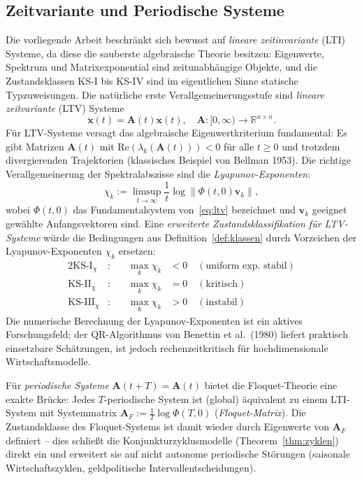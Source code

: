 \documentclass[a4paper, 12pt, twoside, openright]{report}
\theoremstyle{definition}
\theoremstyle{definition}
\newcommand{\R}{\mathbb{R}}
\newcommand{\vx}{\bm{x}}
\newcommand{\vA}{\bm{A}}
\newcommand{\re}{\mathrm{Re}}
\newcommand{\KS}{\mathrm{KS}}
\begin{document}
\subsection{Zeitvariante und Periodische Systeme}
\label{subsec:zeitvariant}

Die vorliegende Arbeit beschränkt sich bewusst auf \emph{lineare zeitinvariante} (LTI)
Systeme, da diese die sauberste algebraische Theorie besitzen: Eigenwerte, Spektrum und
Matrixexponential sind zeitunabhängige Objekte, und die Zustandsklassen KS-I bis KS-IV
sind im eigentlichen Sinne statische Typzuweisungen. Die natürliche erste
Verallgemeinerungsstufe sind \emph{lineare zeitvariante} (LTV) Systeme
\begin{equation}
  \dot{\vx}(t) = \vA(t)\vx(t), \quad \vA : [0,\infty) \to \R^{n \times n}.
  \label{eq:ltv}
\end{equation}
Für LTV-Systeme versagt das algebraische Eigenwertkriterium fundamental: Es gibt
Matrizen $\vA(t)$ mit $\re(\lambda_k(\vA(t))) < 0$ für alle $t \geq 0$ und trotzdem
divergierenden Trajektorien (klassisches Beispiel von Bellman 1953). Die richtige
Verallgemeinerung der Spektralabszisse sind die \emph{Lyapunov-Exponenten}:
\begin{equation}
  \chi_k := \limsup_{t \to \infty} \frac{1}{t} \log \| \Phi(t,0)\bm{v}_k \|,
  \label{eq:lyapunov_exp}
\end{equation}
wobei $\Phi(t,0)$ das Fundamentalsystem von~\eqref{eq:ltv} bezeichnet und $\bm{v}_k$
geeignet gewählte Anfangsvektoren sind. Eine \emph{erweiterte Zustandsklassifikation
für LTV-Systeme} würde die Bedingungen aus Definition~\ref{def:klassen} durch
Vorzeichen der Lyapunov-Exponenten $\chi_k$ ersetzen:
\begin{alignat}{2}
  \KS\text{-I}_\chi  &:\quad &\max_k \chi_k &< 0 \quad (\text{uniform exp. stabil})\\
  \KS\text{-II}_\chi &:\quad &\max_k \chi_k &= 0 \quad (\text{kritisch})\\
  \KS\text{-III}_\chi&:\quad &\max_k \chi_k &> 0 \quad (\text{instabil})
\end{alignat}
Die numerische Berechnung der Lyapunov-Exponenten ist ein aktives Forschungsfeld;
der QR-Algorithmus von Benettin et al.~(1980) liefert praktisch einsetzbare Schätzungen,
ist jedoch rechenzeitkritisch für hochdimensionale Wirtschaftsmodelle.

Für \emph{periodische Systeme} $\vA(t+T) = \vA(t)$ bietet die Floquet-Theorie
eine exakte Brücke: Jedes $T$-periodische System ist (global) äquivalent zu einem
LTI-System mit Systemmatrix $\vA_F := \frac{1}{T}\log \Phi(T,0)$ (\emph{Floquet-Matrix}).
Die Zustandsklasse des Floquet-Systems ist damit wieder durch Eigenwerte von $\vA_F$
definiert -- dies schließt die Konjunkturzyklusmodelle (Theorem~\ref{thm:zyklen}) direkt
ein und erweitert sie auf nicht autonome periodische Störungen (saisonale Wirtschaftszyklen,
geldpolitische Intervall\-entscheidungen).
\end{document}
